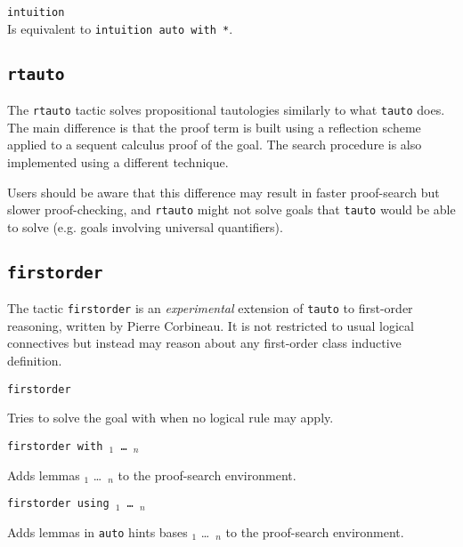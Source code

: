 \begin{Variants}
\item {\tt intuition}\\
  Is equivalent to {\tt intuition auto with *}.
\end{Variants}



\subsection{\tt rtauto
\label{rtauto}}

The {\tt rtauto} tactic solves propositional tautologies similarly to what {\tt tauto} does. The main difference is that the proof term is built using a reflection scheme applied to a sequent calculus proof of the goal. The search procedure is also implemented using a different technique. 

Users should be aware that this difference may result in faster proof-search but  slower proof-checking, and {\tt rtauto} might not solve goals that {\tt tauto} would be able to solve (e.g. goals involving universal quantifiers). 

\subsection{{\tt firstorder}
\label{firstorder}}

The tactic \texttt{firstorder} is an {\it experimental} extension of
\texttt{tauto} to  
first-order reasoning, written by Pierre Corbineau. 
It is not restricted to usual logical connectives but
instead may reason about any first-order class inductive definition.

\begin{Variants}
 \item {\tt firstorder {\tac}}

   Tries to solve the goal with {\tac} when no logical rule may apply.

 \item {\tt firstorder with \ident$_1$ \dots\ \ident$_n$ }

   Adds lemmas \ident$_1$ \dots\ \ident$_n$ to the proof-search
   environment.

 \item {\tt firstorder using \ident$_1$ \dots\ \ident$_n$ }

   Adds lemmas in {\tt auto} hints bases \ident$_1$ \dots\ \ident$_n$
   to the proof-search environment.
\end{Variants}

